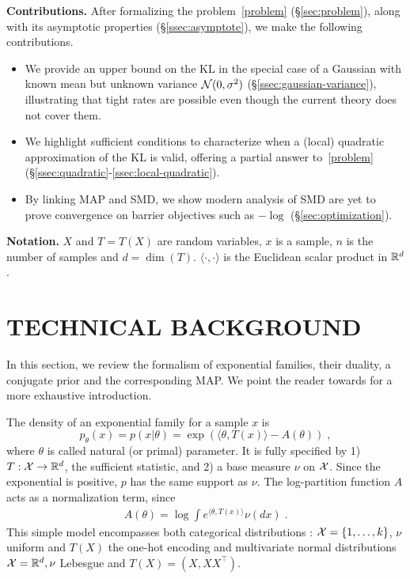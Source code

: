 \documentclass[twoside]{article}
\let\oldsection\section
\renewcommand{\section}[1]{\oldsection{\texorpdfstring{\uppercase{#1}}{#1}}}
\newcommand{\logpart}{A}
\newcommand{\nat}{\theta}
\begin{document}
{\bf Contributions.}
After formalizing the problem~\eqref{problem} (\S\ref{sec:problem}), along with its asymptotic properties (\S\ref{ssec:asymptote}), we make the following contributions.
\begin{itemize}
	\itemsep0em
	\item We provide an upper bound on the KL in the special case of a Gaussian with known mean but unknown variance ${\mathcal N}(0,\sigma^2)$ (\S\ref{ssec:gaussian-variance}), illustrating that tight rates are possible even though the current theory does not cover them.
	\item We highlight sufficient conditions to characterize when a (local) quadratic approximation of the KL is valid, offering a partial answer to~\eqref{problem} (\S\ref{ssec:quadratic}-\ref{ssec:local-quadratic}).
	\item By linking MAP and SMD, we show modern analysis of SMD are yet to prove convergence on barrier objectives such as $-\log$ (\S\ref{sec:optimization}).
\end{itemize}


{\bf Notation.}
$X$ and $T=T(X)$ are random variables, $x$ is a sample, $n$ is the number of samples and $d= \dim(T)$.
$\langle \cdot , \cdot \rangle$ is the Euclidean scalar product in $\mathbb{R}^d$.


\section{Technical background}
\label{sec:background}
In this section, we review the formalism of exponential families, their duality, a conjugate prior and the corresponding MAP.
We point the reader towards \citet[Chapter 3]{wainwright2008graphical} for a more exhaustive introduction.


The density of an exponential family for a sample $x$ is
\begin{equation}
	 p_\nat(x) = p(x|\nat) = \exp( \langle \nat, T(x) \rangle - \logpart(\nat)) \; ,
	 \label{eq:def_expfamily}
\end{equation}
where  $\nat$ is called natural (or primal) parameter.
It is fully specified by 1) $T: {\mathcal X} \rightarrow \mathbb{R}^d$, the sufficient statistic,
and 2) a base measure $\nu$ on ${\mathcal X}$.
Since the exponential is positive, $p$ has the same support as $\nu$.
The log-partition function $\logpart$ acts as a normalization term, since
\begin{align}
    \logpart(\nat) = \log \int e^{\langle \nat, T(x) \rangle} \nu(dx) \;.
\end{align}
This simple model encompasses both categorical distributions : ${\mathcal X} = \{1, \dots, k\}$, $\nu$ uniform and $T(X)$  the one-hot encoding and multivariate normal distributions ${\mathcal X}=\mathbb{R}^d, \nu$ Lebesgue and $T(X)=(X, X X^\top)$.
\end{document}
